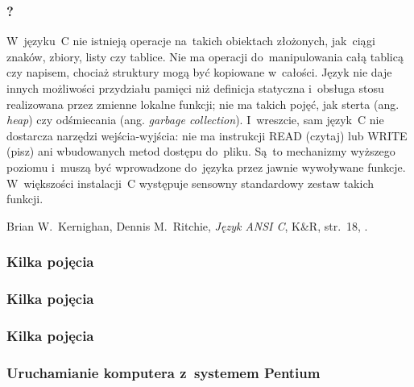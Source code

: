 \documentclass[10pt,t]{beamer}
\begin{document}
\begin{frame}
  \frametitle{?}


  W~języku~C nie istnieją operacje na~takich obiektach złożonych, jak~ciągi
  znaków, zbiory, listy czy tablice. Nie ma operacji do~manipulowania całą
  tablicą czy napisem, chociaż struktury mogą być kopiowane w~całości.
  Język nie daje innych możliwości przydziału pamięci niż definicja
  statyczna i~obsługa stosu realizowana przez zmienne lokalne funkcji; nie
  ma takich pojęć, jak sterta (ang. \textit{heap}) czy odśmiecania
  (ang. \textit{garbage collection}). I~wreszcie, sam język~C nie dostarcza
  narzędzi wejścia-wyjścia: nie ma instrukcji READ (czytaj) lub WRITE (pisz)
  ani wbudowanych metod dostępu do~pliku. Są~to mechanizmy wyższego poziomu
  i~muszą być wprowadzone do~języka przez jawnie wywoływane funkcje.
  W~większości instalacji~C występuje sensowny standardowy zestaw takich
  funkcji.

  Brian W.~Kernighan, Dennis M.~Ritchie, \textit{Język ANSI C}, K\&R,
  str.~18, \parencite{Kernighan-Ritchie-Jezyk-ANSI-C-Pub-2004}.

\end{frame}





\begin{frame}
  \frametitle{Kilka pojęcia}




\end{frame}





\begin{frame}
  \frametitle{Kilka pojęcia}




\end{frame}





\begin{frame}
  \frametitle{Kilka pojęcia}




\end{frame}





\begin{frame}
  \frametitle{Uruchamianie komputera z~systemem Pentium}




\end{frame}
\end{document}
